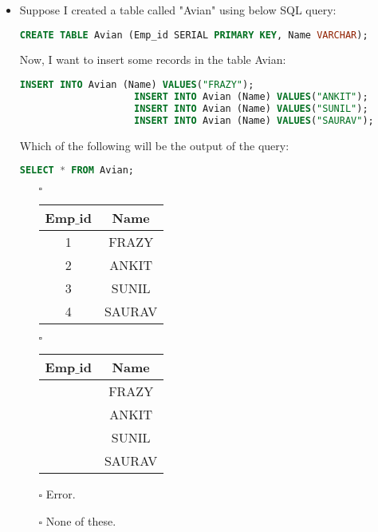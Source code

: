 \documentclass[10pt]{article}
\newcommand{\lightrule}{%
	\arrayrulecolor{black!30}%
	\midrule[\lightrulewidth]%
	\arrayrulecolor{black}}
\begin{document}
\begin{itemize}
			\item Suppose I created a table called "Avian" using below SQL query: 
				\begin{lstlisting}[language=SQL,firstline=1, lastline=1] 
					CREATE TABLE Avian (Emp_id SERIAL PRIMARY KEY, Name VARCHAR);
				\end{lstlisting}
				Now, I want to insert some records in the table Avian:
				\begin{lstlisting}[language=SQL,firstline=1, lastline=4] 
					INSERT INTO Avian (Name) VALUES("FRAZY");
					INSERT INTO Avian (Name) VALUES("ANKIT");
					INSERT INTO Avian (Name) VALUES("SUNIL");
					INSERT INTO Avian (Name) VALUES("SAURAV");
				\end{lstlisting}
				Which of the following will be the output of the query:
				\begin{lstlisting}[language=SQL,firstline=1, lastline=1] 
					SELECT * FROM Avian;
				\end{lstlisting}

				\begin{enumerate}
					\item[$\square$]
						\begin{tabular}{@{} *{2}{c} @{}}
							\toprule
								\textbf{Emp$\_$id} & \textbf{Name} \\
							\midrule
								1 & FRAZY \\
							\lightrule
								2 & ANKIT \\
							\lightrule
								3 & SUNIL \\
							\lightrule
								4 & SAURAV \\
							\bottomrule
						\end{tabular}

					\item[$\square$]
						\begin{tabular}{@{} *{2}{c} @{}}
							\toprule
								\textbf{Emp$\_$id} & \textbf{Name} \\
							\midrule
								& FRAZY \\
							\lightrule
								& ANKIT \\
							\lightrule
								& SUNIL \\
							\lightrule
								& SAURAV \\
							\bottomrule
						\end{tabular}

					\item[$\square$] Error.
					\item[$\square$] None of these.
				\end{enumerate}
		\end{itemize}
\end{document}
